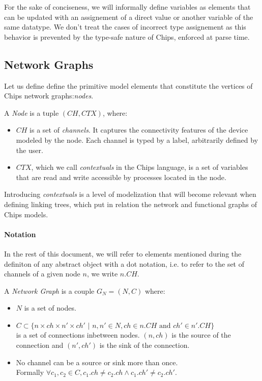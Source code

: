 \documentclass[runningheads]{llncs}
\begin{document}
For the sake of conciseness, we will informally define variables as elements that can be updated with an assignement of a direct value or another variable of the same datatype. We don't treat the cases of incorrect type assignement as this behavior is prevented by the type-safe nature of Chips, enforced at parse time. 

\subsection{Network Graphs}
\label{sec:networkgraphs}

Let us define define the primitive model elements that constitute the vertices of Chips network graphs:\emph{nodes}.

\begin{definition}\label{def:node}
    A \emph{Node} is a tuple $(CH, CTX)$, where:
    \begin{itemize}
        \item $CH$ is a set of \emph{channels}. It captures the connectivity features of the device modeled by the node. Each channel is typed by a label, arbitrarily defined by the user.
        \item $CTX$, which we call \emph{contextuals} in the Chips language, is a set of variables that are read and write accessible by processes located in the node. 
    \end{itemize}
\end{definition}

Introducing \emph{contextuals} is a level of modelization that will become relevant when defining linking trees, which put in relation the network and functional graphs of Chips models.

\paragraph{Notation} In the rest of this document, we will refer to elements mentioned during the definiton of any abstract object with a dot notation, i.e. to refer to the set of channels of a given node $n$, we write $n.CH$.

\begin{definition}\label{def:network_graph}
    A \emph{Network Graph} is a couple $G_N = (N,C)$ where:
    \begin{itemize}
        \item $N$ is a set of nodes.
        \item $C \subset \{n \times ch \times n' \times ch' \text{ | } n,n' \in N, ch \in n.CH \text{ and } ch' \in n'.CH \}$\\is a set of connections inbetween nodes. $(n,ch)$ is the source of the connection and $(n',ch')$ is the sink of the connection.
        \item No channel can be a source or sink more than once. \\Formally $\forall c_1,c_2 \in C, c_1.ch \neq c_2.ch \wedge c_1.ch' \neq c_2.ch'$.
    \end{itemize}
\end{definition}
\end{document}
